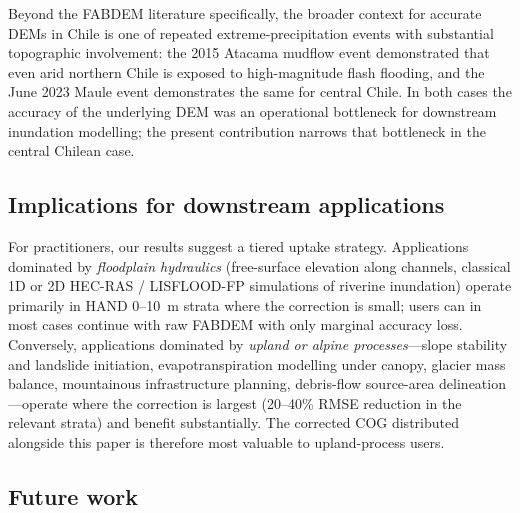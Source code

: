\documentclass[preprint,authoryear,number]{elsarticle}
\begin{document}
Beyond the FABDEM literature specifically, the broader context for accurate DEMs in Chile is one of repeated extreme-precipitation events with substantial topographic involvement: the 2015 Atacama mudflow event \citep{Wilcox2016Atacama} demonstrated that even arid northern Chile is exposed to high-magnitude flash flooding, and the June 2023 Maule event \citep{CIGIDEN2023MataquitoMaule,Garreaud2024AR2023} demonstrates the same for central Chile. In both cases the accuracy of the underlying DEM was an operational bottleneck for downstream inundation modelling; the present contribution narrows that bottleneck in the central Chilean case.

\subsection{Implications for downstream applications}
\label{sec:implications}

For practitioners, our results suggest a tiered uptake strategy. Applications dominated by \emph{floodplain hydraulics} (free-surface elevation along channels, classical 1D or 2D HEC-RAS / LISFLOOD-FP simulations of riverine inundation) operate primarily in HAND 0--\SI{10}{\meter} strata where the correction is small; users can in most cases continue with raw FABDEM with only marginal accuracy loss. Conversely, applications dominated by \emph{upland or alpine processes}---slope stability and landslide initiation, evapotranspiration modelling under canopy, glacier mass balance, mountainous infrastructure planning, debris-flow source-area delineation---operate where the correction is largest (20--40\% RMSE reduction in the relevant strata) and benefit substantially. The corrected COG distributed alongside this paper is therefore most valuable to upland-process users.

\subsection{Future work}
\label{sec:future_work}
\end{document}

